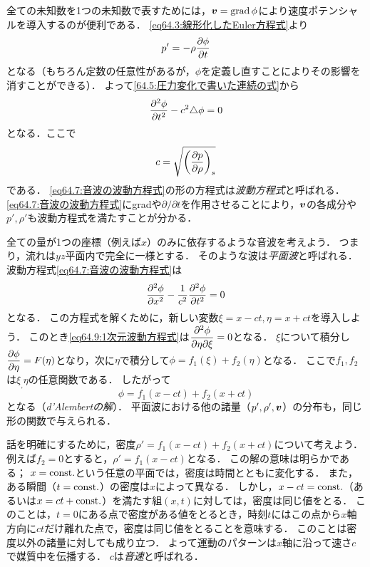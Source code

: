 全ての未知数を1つの未知数で表すためには，$\vb*{v}=\operatorname{grad}\phi$により速度ポテンシャルを導入するのが便利である．
\eqref{eq64.3:線形化したEuler方程式}より
\begin{equation}
    p' = -\rho \pdv{\phi}{t}
\end{equation}
となる（もちろん定数の任意性があるが，$\phi$を定義し直すことによりその影響を消すことができる）．
よって\eqref{64.5:圧力変化で書いた連続の式}から
\begin{equation}\label{eq64.7:音波の波動方程式}
    \pdv[2]{\phi}{t} - c^2 \triangle\phi = 0
\end{equation}
となる．ここで
\begin{equation}\label{eq64.8:音速の定義式}
    c = \sqrt{\PDV{p}{\rho}{s}}
\end{equation}
である．
\eqref{eq64.7:音波の波動方程式}の形の方程式は\emph{波動方程式}と呼ばれる．
\eqref{eq64.7:音波の波動方程式}にgradや$\partial/\partial t$を作用させることにより，$\vb*{v}$の各成分や$p',\rho'$も波動方程式を満たすことが分かる．

全ての量が1つの座標（例えば$x$）のみに依存するような音波を考えよう．
つまり，流れは$yz$平面内で完全に一様とする．
そのような波は\emph{平面波}と呼ばれる．
波動方程式\eqref{eq64.7:音波の波動方程式}は
\begin{equation}\label{eq64.9:1次元波動方程式}
    \pdv[2]{\phi}{x} - \frac{1}{c^2} \pdv[2]{\phi}{t} = 0
\end{equation}
となる．
この方程式を解くために，新しい変数$\xi=x-ct, \eta=x+ct$を導入しよう．
このとき\eqref{eq64.9:1次元波動方程式}は$\dpdv[2]{\phi}{\eta}{\xi}=0$となる．
$\xi$について積分し$\dpdv{\phi}{\eta}=F(\eta)$となり，次に$\eta$で積分して$\phi=f_1(\xi)+f_2(\eta)$となる．
ここで$f_1,f_2$は$\xi_,\eta$の任意関数である．
したがって
\begin{equation}
    \phi = f_1(x-ct) + f_2(x+ct)
\end{equation}
となる（\emph{d'Alembertの解}）．
平面波における他の諸量（$p',\rho',\vb*{v}$）の分布も，同じ形の関数で与えられる．



話を明確にするために，密度$\rho'=f_1(x-ct)+f_2(x+ct)$について考えよう．
例えば$f_2=0$とすると，$\rho'=f_1(x-ct)$となる．
この解の意味は明らかである；
$x=\mathrm{const.}$という任意の平面では，密度は時間とともに変化する．
また，ある瞬間（$t=\mathrm{const.}$）の密度は$x$によって異なる．
しかし，$x-ct=\mathrm{const.}$（あるいは$x=ct+\mathrm{const.}$）を満たす組$(x,t)$に対しては，密度は同じ値をとる．
このことは，$t=0$にある点で密度がある値をとるとき，時刻$t$にはこの点から$x$軸方向に$ct$だけ離れた点で，密度は同じ値をとることを意味する．
このことは密度以外の諸量に対しても成り立つ．
よって運動のパターンは$x$軸に沿って速さ$c$で媒質中を伝播する．
$c$は\emph{音速}と呼ばれる．



